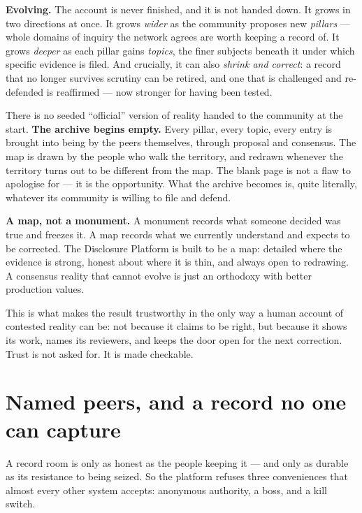 \documentclass[11pt,a4paper]{article}
\begin{document}
\textbf{Evolving.} The account is never finished, and it is not handed down.
It grows in two directions at once. It grows \emph{wider} as the community
proposes new \emph{pillars} --- whole domains of inquiry the network agrees
are worth keeping a record of. It grows \emph{deeper} as each pillar gains
\emph{topics}, the finer subjects beneath it under which specific evidence is
filed. And crucially, it can also \emph{shrink and correct}: a record that
no longer survives scrutiny can be retired, and one that is challenged and
re-defended is reaffirmed --- now stronger for having been tested.

There is no seeded ``official'' version of reality handed to the community
at the start. \textbf{The archive begins empty.} Every pillar, every topic,
every entry is brought into being by the peers themselves, through proposal
and consensus. The map is drawn by the people who walk the territory, and
redrawn whenever the territory turns out to be different from the map. The
blank page is not a flaw to apologise for --- it is the opportunity. What the
archive becomes is, quite literally, whatever its community is willing to
file and defend.

\begin{notebox}
\textbf{A map, not a monument.} A monument records what someone decided was
true and freezes it. A map records what we currently understand and expects
to be corrected. The Disclosure Platform is built to be a map: detailed
where the evidence is strong, honest about where it is thin, and always open
to redrawing. A consensus reality that cannot evolve is just an orthodoxy
with better production values.
\end{notebox}

This is what makes the result trustworthy in the only way a human account
of contested reality can be: not because it claims to be right, but because
it shows its work, names its reviewers, and keeps the door open for the next
correction. Trust is not asked for. It is made checkable.

\section{Named peers, and a record no one can capture}

A record room is only as honest as the people keeping it --- and only as
durable as its resistance to being seized. So the platform refuses three
conveniences that almost every other system accepts: anonymous authority, a
boss, and a kill switch.
\end{document}
